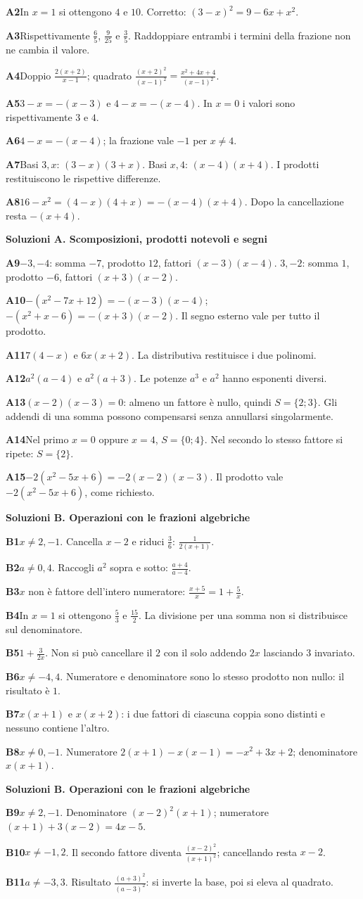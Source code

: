 \documentclass[11pt,a4paper]{article}
\newcommand{\tit}[1]{\par{\Large\bfseries\color{blu}#1}\par\smallskip}
\newcommand{\sott}[1]{\par\medskip{\large\bfseries\color{blu}#1}\par\smallskip}
\newcommand{\sol}[2]{\Needspace{3\baselineskip}\par\medskip\textbf{\color{verde}#1}\quad #2\par}
\begin{document}
\sol{A2}{In $x=1$ si ottengono $4$ e $10$. Corretto: $(3-x)^2=9-6x+x^2$.}
\sol{A3}{Rispettivamente $\frac65$, $\frac9{25}$ e $\frac35$. Raddoppiare entrambi i termini della frazione non ne cambia il valore.}
\sol{A4}{Doppio $\frac{2(x+2)}{x-1}$; quadrato $\frac{(x+2)^2}{(x-1)^2}=\frac{x^2+4x+4}{(x-1)^2}$.}
\sol{A5}{$3-x=-(x-3)$ e $4-x=-(x-4)$. In $x=0$ i valori sono rispettivamente $3$ e $4$.}
\sol{A6}{$4-x=-(x-4)$; la frazione vale $-1$ per $x\ne4$.}
\sol{A7}{Basi $3,x$: $(3-x)(3+x)$. Basi $x,4$: $(x-4)(x+4)$. I prodotti restituiscono le rispettive differenze.}
\sol{A8}{$16-x^2=(4-x)(4+x)=-(x-4)(x+4)$. Dopo la cancellazione resta $-(x+4)$.}
\clearpage
\tit{Soluzioni A. Scomposizioni, prodotti notevoli e segni}
\sott{A9--A15}
\sol{A9}{$-3,-4$: somma $-7$, prodotto $12$, fattori $(x-3)(x-4)$. $3,-2$: somma $1$, prodotto $-6$, fattori $(x+3)(x-2)$.}
\sol{A10}{$-(x^2-7x+12)=-(x-3)(x-4)$; $-(x^2+x-6)=-(x+3)(x-2)$. Il segno esterno vale per tutto il prodotto.}
\sol{A11}{$7(4-x)$ e $6x(x+2)$. La distributiva restituisce i due polinomi.}
\sol{A12}{$a^2(a-4)$ e $a^2(a+3)$. Le potenze $a^3$ e $a^2$ hanno esponenti diversi.}
\sol{A13}{$(x-2)(x-3)=0$: almeno un fattore è nullo, quindi $S=\{2;3\}$. Gli addendi di una somma possono compensarsi senza annullarsi singolarmente.}
\sol{A14}{Nel primo $x=0$ oppure $x=4$, $S=\{0;4\}$. Nel secondo lo stesso fattore si ripete: $S=\{2\}$.}
\sol{A15}{$-2(x^2-5x+6)=-2(x-2)(x-3)$. Il prodotto vale $-2(x^2-5x+6)$, come richiesto.}
\clearpage
\tit{Soluzioni B. Operazioni con le frazioni algebriche}
\sott{B1--B8}
\sol{B1}{$x\ne2,-1$. Cancella $x-2$ e riduci $\frac36$: $\frac1{2(x+1)}$.}
\sol{B2}{$a\ne0,4$. Raccogli $a^2$ sopra e sotto: $\frac{a+4}{a-4}$.}
\sol{B3}{$x$ non è fattore dell’intero numeratore: $\frac{x+5}{x}=1+\frac5x$.}
\sol{B4}{In $x=1$ si ottengono $\frac53$ e $\frac{15}2$. La divisione per una somma non si distribuisce sul denominatore.}
\sol{B5}{$1+\frac3{2x}$. Non si può cancellare il $2$ con il solo addendo $2x$ lasciando $3$ invariato.}
\sol{B6}{$x\ne-4,4$. Numeratore e denominatore sono lo stesso prodotto non nullo: il risultato è $1$.}
\sol{B7}{$x(x+1)$ e $x(x+2)$: i due fattori di ciascuna coppia sono distinti e nessuno contiene l’altro.}
\sol{B8}{$x\ne0,-1$. Numeratore $2(x+1)-x(x-1)=-x^2+3x+2$; denominatore $x(x+1)$.}
\clearpage
\tit{Soluzioni B. Operazioni con le frazioni algebriche}
\sott{B9--B15}
\sol{B9}{$x\ne2,-1$. Denominatore $(x-2)^2(x+1)$; numeratore $(x+1)+3(x-2)=4x-5$.}
\sol{B10}{$x\ne-1,2$. Il secondo fattore diventa $\frac{(x-2)^2}{(x+1)^2}$; cancellando resta $x-2$.}
\sol{B11}{$a\ne-3,3$. Risultato $\frac{(a+3)^2}{(a-3)^2}$: si inverte la base, poi si eleva al quadrato.}
\end{document}
